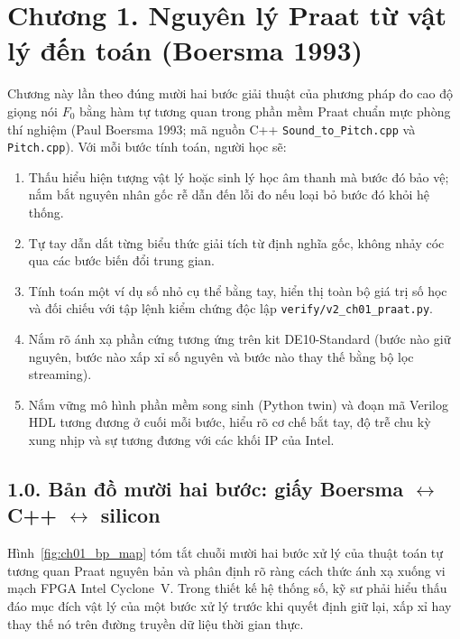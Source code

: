 \clearpage
{}
\section*{Chương 1. Nguyên lý Praat từ vật lý đến toán (Boersma 1993)}

\begin{learningobj}
Chương này lần theo đúng mười hai bước giải thuật của phương pháp đo cao độ giọng nói $F_0$ bằng hàm tự tương quan trong phần mềm Praat chuẩn mực phòng thí nghiệm (Paul Boersma 1993; mã nguồn C++ \texttt{Sound\_to\_Pitch.cpp} và \texttt{Pitch.cpp}). Với mỗi bước tính toán, người học sẽ:
\begin{enumerate}[leftmargin=1.4em]
    \item Thấu hiểu hiện tượng vật lý hoặc sinh lý học âm thanh mà bước đó bảo vệ; nắm bắt nguyên nhân gốc rễ dẫn đến lỗi đo nếu loại bỏ bước đó khỏi hệ thống.
    \item Tự tay dẫn dắt từng biểu thức giải tích từ định nghĩa gốc, không nhảy cóc qua các bước biến đổi trung gian.
    \item Tính toán một ví dụ số nhỏ cụ thể bằng tay, hiển thị toàn bộ giá trị số học và đối chiếu với tập lệnh kiểm chứng độc lập \texttt{verify/v2\_ch01\_praat.py}.
    \item Nắm rõ ánh xạ phần cứng tương ứng trên kit DE10-Standard (bước nào giữ nguyên, bước nào xấp xỉ số nguyên và bước nào thay thế bằng bộ lọc streaming).
    \item Nắm vững mô hình phần mềm song sinh (Python twin) và đoạn mã Verilog HDL tương đương ở cuối mỗi bước, hiểu rõ cơ chế bắt tay, độ trễ chu kỳ xung nhịp và sự tương đương với các khối IP của Intel.
\end{enumerate}
\end{learningobj}

\subsection*{1.0. Bản đồ mười hai bước: giấy Boersma $\leftrightarrow$ C++ $\leftrightarrow$ silicon}

Hình~\ref{fig:ch01_bp_map} tóm tắt chuỗi mười hai bước xử lý của thuật toán tự tương quan Praat nguyên bản và phân định rõ ràng cách thức ánh xạ xuống vi mạch FPGA Intel Cyclone~V. Trong thiết kế hệ thống số, kỹ sư phải hiểu thấu đáo mục đích vật lý của một bước xử lý trước khi quyết định giữ lại, xấp xỉ hay thay thế nó trên đường truyền dữ liệu thời gian thực.

